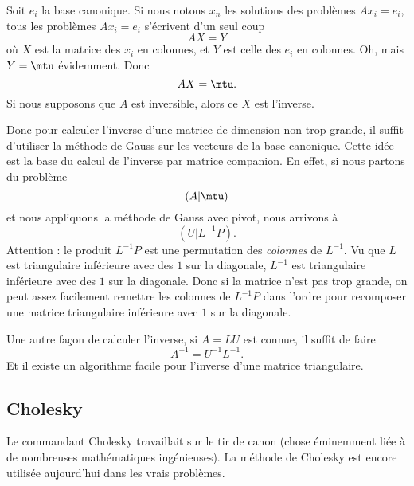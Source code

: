 Soit \( {e_i}\) la base canonique. Si nous notons \( x_n\) les solutions des problèmes \( Ax_i=e_i\), tous les problèmes \( Ax_i=e_i\) s'écrivent d'un seul coup 
\begin{equation}
    AX=Y
\end{equation}
où \( X\) est la matrice des \( x_i\) en colonnes, et \( Y\) est celle des \( e_i\) en colonnes. Oh, mais \( Y=\mtu\) évidemment. Donc
\begin{equation}
    AX=\mtu.
\end{equation}
Si nous supposons que \( A\) est inversible, alors ce \( X\) est l'inverse.

Donc pour calculer l'inverse d'une matrice de dimension non trop grande, il suffit d'utiliser la méthode de Gauss sur les vecteurs de la base canonique. Cette idée est la base du calcul de l'inverse par matrice companion. En effet, si nous partons du problème
\begin{equation}
    (A|\mtu)
\end{equation}
et nous appliquons la méthode de Gauss avec pivot, nous arrivons à
\begin{equation}
    (U|L^{-1} P).
\end{equation}
Attention : le produit \( L^{-1}P\) est une permutation des \emph{colonnes} de \( L^{-1}\). Vu que \( L\) est triangulaire inférieure avec des \( 1\) sur la diagonale, \( L^{-1}\) est triangulaire inférieure avec des \( 1\) sur la diagonale. Donc si la matrice n'est pas trop grande, on peut assez facilement remettre les colonnes de \( L^{-1}P\) dans l'ordre pour recomposer une matrice triangulaire inférieure avec \( 1\) sur la diagonale.

Une autre façon de calculer l'inverse, si \( A=LU\) est connue, il suffit de faire 
\begin{equation}
    A^{-1}=U^{-1}L^{-1}.
\end{equation}
Et il existe un algorithme facile pour l'inverse d'une matrice triangulaire.

\subsection{Cholesky}

Le commandant Cholesky travaillait sur le tir de canon (chose éminemment liée à de nombreuses mathématiques ingénieuses). La méthode de Cholesky est encore utilisée aujourd'hui dans les vrais problèmes.

